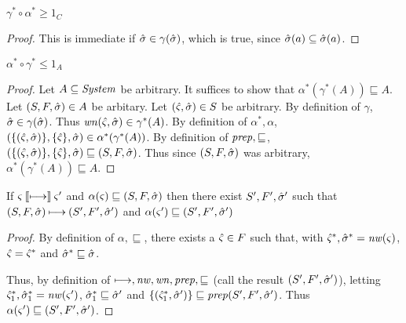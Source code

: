 \documentclass{llncs}
\begin{document}
\begin{lemma}
$\gamma^* \circ \alpha^* \ge 1_C$
\end{lemma}
\begin{proof}
This is immediate if $\hat{\sigma} \in \gamma(\hat{\sigma})$, which is true, since
$\hat{\sigma}(a) \subseteq \hat{\sigma}(a)$.
\end{proof}

\begin{lemma}
$\alpha^* \circ \gamma^* \le 1_A$
\end{lemma}
\begin{proof}
Let $A \subseteq \mathit{System}$ be arbitrary.
It suffices to show that $\alpha^*(\gamma^*(A)) \sqsubseteq A$.
Let $(S,F,\hat{\sigma}) \in A$ be arbitary.
Let $(\hat{\varsigma},\hat{\sigma}) \in S$ be arbitrary.
By definition of $\gamma$, $\hat{\sigma} \in \gamma(\hat{\sigma})$.
Thus $\mathit{wn}(\hat{\varsigma},\hat{\sigma}) \in \gamma^*(A)$.
By definition of $\alpha^*,\alpha$, $(\{(\hat{\varsigma}, \hat{\sigma})\},\{\hat{\varsigma}\},\hat{\sigma}) \in \alpha^*(\gamma^*(A))$.
By definition of $\mathit{prep},\sqsubseteq$, $(\{(\hat{\varsigma}, \hat{\sigma})\},\{\hat{\varsigma}\},\hat{\sigma}) \sqsubseteq (S,F,\hat{\sigma})$.
Thus since $(S,F,\hat{\sigma})$ was arbitrary, $\alpha^*(\gamma^*(A)) \sqsubseteq A$.
\end{proof}

\begin{theorem}
If $\varsigma \mathbin{\llbracket\mathbin{\longmapsto}\rrbracket} \varsigma'$ and $\alpha(\varsigma) \sqsubseteq (S,F,\hat{\sigma})$
then there exist $S',F',\hat{\sigma}'$ such that
$(S,F,\hat{\sigma}) \mathbin{\longmapsto} (S',F',\hat{\sigma}')$ and
$\alpha(\varsigma') \sqsubseteq (S',F',\hat{\sigma}')$
\end{theorem}
\begin{proof}
By definition of $\alpha, \sqsubseteq$, there exists a $\hat{\varsigma} \in F$
such that, with $\hat{\varsigma}^*,\hat{\sigma}^* = \mathit{nw}(\varsigma)$,
$\hat{\varsigma} = \hat{\varsigma}^*$ and $\hat{\sigma}^* \sqsubseteq \hat{\sigma}$.

Thus, by definition of $\mathbin{\longmapsto}, \mathit{nw}, \mathit{wn},\mathit{prep},\sqsubseteq$ (call the result $(S',F',\hat{\sigma}')$),
letting $\hat{\varsigma}^*_1,\hat{\sigma}^*_1 = \mathit{nw}(\varsigma')$,
$\hat{\sigma}^*_1 \sqsubseteq \hat{\sigma}'$ and
$\{(\hat{\varsigma}^*_1, \hat{\sigma}')\} \sqsubseteq \mathit{prep}(S',F',\hat{\sigma}')$.
Thus $\alpha(\varsigma') \sqsubseteq(S', F', \hat{\sigma}')$.
\end{proof}

\end{document}
